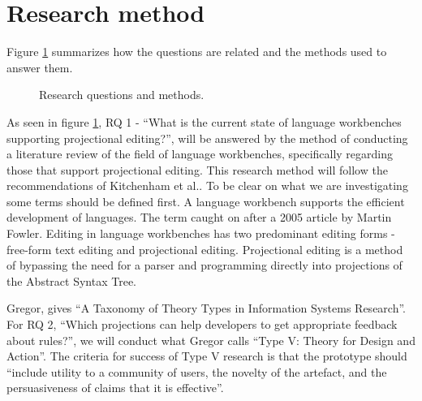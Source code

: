 \section{Research method}

Figure \ref{fig:Research_Questions} summarizes how the questions are related and the methods used to answer them.
\begin{figure}[h]
    \centering
    \caption{Research questions and methods.}
    \label{fig:Research_Questions}
\end{figure}

As seen in figure \ref{fig:Research_Questions}, RQ 1 - ``What is the current state of language workbenches supporting projectional editing?'', will be answered by the method of conducting a literature review of the field of language workbenches, specifically regarding those that support projectional editing. 
This research method will follow the recommendations of Kitchenham et al.\cite{kitchenham2015evidence}.
To be clear on what we are investigating some terms should be defined first.
A language workbench supports the efficient development of languages. 
The term caught on after a 2005 article by Martin Fowler\cite{Fowler_lwb}. 
Editing in language workbenches has two predominant editing forms - free-form text editing and projectional editing\cite{erdweg2013state}.
Projectional editing is a method of bypassing the need for a parser and programming directly into projections of the Abstract Syntax Tree.

Gregor\cite{gregor2006nature}, gives ``A Taxonomy of Theory Types in Information Systems Research''. 
For RQ 2, ``Which projections can help developers to get appropriate feedback about rules?'', we will conduct what Gregor calls ``Type V: Theory for Design and Action''. 
The criteria for success of Type V research is that the prototype should ``include utility to a community of users, the novelty of the artefact, and the persuasiveness of claims that it is effective''.

